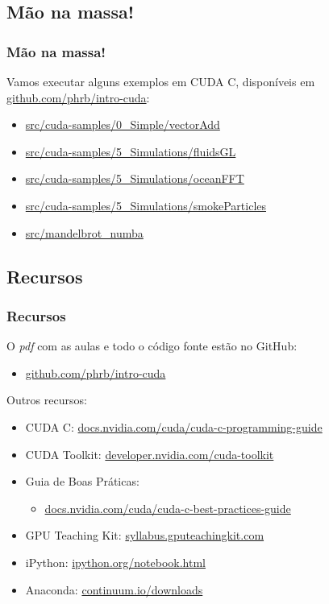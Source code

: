 \documentclass[10pt, compress]{beamer}
\begin{document}
\subsection{Mão na massa!}

\begin{frame}
    \frametitle{Mão na massa!}
    Vamos executar alguns exemplos em CUDA C,
    disponíveis em \url{github.com/phrb/intro-cuda}:
    \begin{itemize}
        \item \url{src/cuda-samples/0_Simple/vectorAdd}
            \pause
        \item \url{src/cuda-samples/5_Simulations/fluidsGL}
        \item \url{src/cuda-samples/5_Simulations/oceanFFT}
        \item \url{src/cuda-samples/5_Simulations/smokeParticles}
            \pause
        \item \url{src/mandelbrot_numba}
    \end{itemize}
\end{frame}

\subsection{Recursos}

\begin{frame}
    \frametitle{Recursos}
    O \emph{pdf} com as aulas e todo o código fonte estão no \alert{GitHub}:

    \begin{itemize}
        \item \url{github.com/phrb/intro-cuda}
    \end{itemize}

    Outros recursos:

    \begin{itemize}
        \item CUDA C: \url{docs.nvidia.com/cuda/cuda-c-programming-guide}
        \item CUDA Toolkit: \url{developer.nvidia.com/cuda-toolkit}
        \item Guia de Boas Práticas:
            \begin{itemize}
                \item \url{docs.nvidia.com/cuda/cuda-c-best-practices-guide}
            \end{itemize}
        \item GPU Teaching Kit: \url{syllabus.gputeachingkit.com}
        \item iPython: \url{ipython.org/notebook.html}
        \item Anaconda: \url{continuum.io/downloads}
    \end{itemize}
\end{frame}
\end{document}
